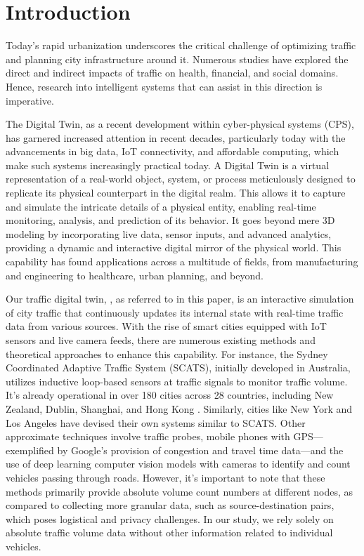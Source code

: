 \chapter{Introduction}\label{chap0}

Today's rapid urbanization underscores the critical challenge of optimizing traffic and planning city infrastructure around it. Numerous studies have explored the direct and indirect impacts of traffic on health\cite{levy2010evaluation}, financial\cite{gorea2016financial}, and social domains\cite{anciaes2017social}. Hence, research into intelligent systems that can assist in this direction is imperative.

The Digital Twin, as a recent development within cyber-physical systems (CPS), has garnered increased attention in recent decades\cite{guo2017mobile}\cite{singh2021digital}, particularly today with the advancements in big data, IoT connectivity, and affordable computing, which make such systems increasingly practical today. A Digital Twin is a virtual representation of a real-world object\cite{VANDERHORN2021113524}, system, or process meticulously designed to replicate its physical counterpart in the digital realm. This allows it to capture and simulate the intricate details of a physical entity, enabling real-time monitoring, analysis, and prediction of its behavior. It goes beyond mere 3D modeling by incorporating live data, sensor inputs, and advanced analytics, providing a dynamic and interactive digital mirror of the physical world\cite{VANDERHORN2021113524}. This capability has found applications across a multitude of fields, from manufacturing and engineering to healthcare, urban planning, and beyond.

Our traffic digital twin, \modelname, as referred to in this paper, is an interactive simulation of city traffic that continuously updates its internal state with real-time traffic data from various sources. With the rise of smart cities equipped with IoT sensors and live camera feeds, there are numerous existing methods and theoretical approaches to enhance this capability. For instance, the Sydney Coordinated Adaptive Traffic System (SCATS)\cite{scats}, initially developed in Australia, utilizes inductive loop-based sensors at traffic signals to monitor traffic volume. It's already operational in over 180 cities across 28 countries, including New Zealand, Dublin, Shanghai, and Hong Kong \cite{wiki:sydney_traffic_system}. Similarly, cities like New York and Los Angeles have devised their own systems similar to SCATS. Other approximate techniques involve traffic probes\cite{zhu2012probe}, mobile phones with GPS\cite{rose2006mobile}—exemplified by Google's provision of congestion and travel time data—and the use of deep learning computer vision models with cameras to identify and count vehicles passing through roads. However, it's important to note that these methods primarily provide absolute volume count numbers at different nodes, as compared to collecting more granular data, such as source-destination pairs, which poses logistical and privacy challenges. In our study, we rely solely on absolute traffic volume data without other information related to individual vehicles.

